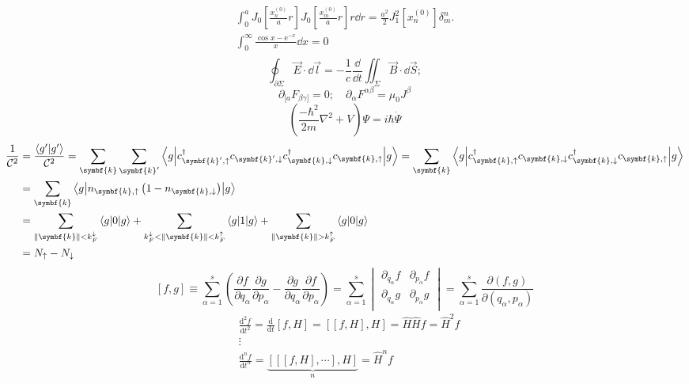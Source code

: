 \documentclass{article}
\def\ee{\mathrm{e}}
\def\bm{\symbf}
\newcommand{\innerprod}[2]{\left\langle{#1}\middle\vert{#2}\right\rangle}
\newcommand{\brakket}[3]{\left\langle{#1}\middle\vert{#2}\middle\vert{#3}\right\rangle}
\begin{document}
\begin{align*}
\int_{0}^aJ_0\left[\frac{x_n^{(0)}}{a}r\right]J_0\left[\frac{x_m^{(0)}}{a}r\right]r\dd{r}=\frac{a^2}{2}J_1^2[x_n^{(0)}]\delta_m^n.\\
\int_{0}^{\infty}\frac{\cos x-\ee^{-x}}{x}\dd{x}=0\\
\end{align*}
\[\oint_{\partial\Sigma}\vec E\cdot \dd{\vec{l}}=-\frac{1}{c}\frac{\dd}{\dd t}\iint_{\Sigma}\vec B \cdot \dd{\vec{S}};\]
\[\partial_{[a}F_{\beta\gamma]}=0;\quad \partial_\alpha F^{\alpha\beta}=\mu_0J^\beta\]
\[\left(\frac{-\hbar^2}{2m}\nabla^2+V\right)\Psi=i\hbar\dot{\Psi}\]
\[\begin{split}
\frac{1}{\mathcal{C}^2}&{}=\frac{\innerprod{g'}{g'}}{\mathcal{C}^2}=\sum_{\bm{k}}\sum_{\bm{k}'}\brakket{g}{c_{\bm{k}',\uparrow}^\dagger c_{\bm{k}',\downarrow} c_{\bm{k},\downarrow}^\dagger c_{\bm{k},\uparrow}}{g}=\sum_{\bm{k}}\brakket{g}{c_{\bm{k},\uparrow}^\dagger c_{\bm{k},\downarrow} c_{\bm{k},\downarrow}^\dagger c_{\bm{k},\uparrow}}{g}\\
&{}=\sum_{\bm{k}}\brakket{g}{n_{\bm{k},\uparrow}\left(1-n_{\bm{k},\downarrow}\right)}{g}\\
&{}=\sum_{\norm{\bm{k}}<k_F^\downarrow}\brakket{g}{0}{g}+\sum_{k_F^\downarrow<\norm{\bm{k}}<k_F^\uparrow}\brakket{g}{1}{g}+\sum_{\norm{\bm{k}}>k_F^\uparrow}\brakket{g}{0}{g}\\
&{}=N_\uparrow-N_\downarrow
\end{split}\]
\[\left[ f,g \right]\equiv \sum_{\alpha =1}^{s}{\left( \frac{\partial f}{\partial {{q}_{\alpha }}}\frac{\partial g}{\partial {{p}_{\alpha }}}-\frac{\partial g}{\partial {{q}_{\alpha }}}\frac{\partial f}{\partial {{p}_{\alpha }}} \right)}=\sum\limits_{\alpha =1}^{s}{\begin{vmatrix}
	\partial_{{q}_{\alpha }} f & \partial_{{p}_{\alpha }} f  \\
	\partial_{{q}_{\alpha }} g & \partial_{{p}_{\alpha }} g  \\
	\end{vmatrix} }=\sum\limits_{\alpha =1}^{s}{\frac{\partial \left( f,g \right)}{\partial \left( {{q}_{\alpha }},{{p}_{\alpha }} \right)}}\]
\[\begin{split}
& \frac{{{\text{d}}^{2}}f}{\text{d}{{t}^{2}}}=\frac{\text{d}}{\text{d}t}\left[ f,H \right]=\left[ \left[ f,H \right],H \right]=\hat{H}\hat{H}f={{{\hat{H}}}^{2}}f \\ 
& \vdots  \\ 
& \frac{{{\text{d}}^{n}}f}{\text{d}{{t}^{n}}}=\underbrace{\left[ \left[ \left[ f,H \right],\cdots  \right],H \right]}_{n}={{{\hat{H}}}^{n}}f  \\
\end{split}\]
\end{document}
